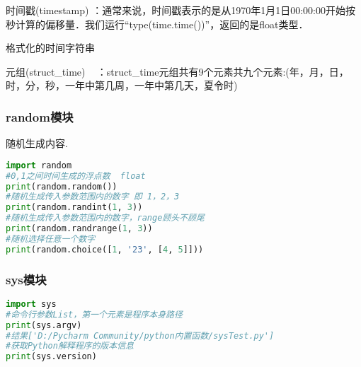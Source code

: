 时间戳(timestamp) ：通常来说，时间戳表示的是从1970年1月1日00:00:00开始按秒计算的偏移量．我们运行“type(time.time())”，返回的是float类型．

格式化的时间字符串

元组(struct_time)   ：struct_time元组共有9个元素共九个元素:(年，月，日，时，分，秒，一年中第几周，一年中第几天，夏令时)

\subsubsection{random模块}
随机生成内容.
\begin{lstlisting}[language=python]
import random
#0,1之间时间生成的浮点数  float
print(random.random())
#随机生成传入参数范围内的数字 即 1，2，3
print(random.randint(1, 3))
#随机生成传入参数范围内的数字，range顾头不顾尾
print(random.randrange(1, 3))
#随机选择任意一个数字
print(random.choice([1, '23', [4, 5]]))
\end{lstlisting}

\subsubsection{sys模块}
\begin{lstlisting}[language=python]
import sys
#命令行参数List，第一个元素是程序本身路径
print(sys.argv)
#结果['D:/Pycharm Community/python内置函数/sysTest.py']
#获取Python解释程序的版本信息
print(sys.version)
\end{lstlisting}

